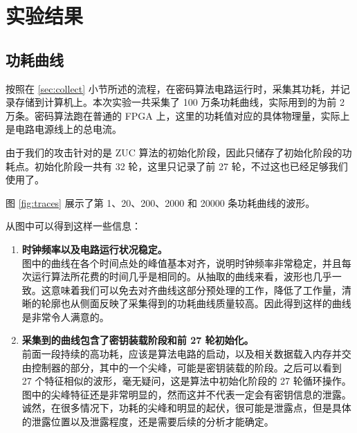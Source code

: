 

\chapter{实验结果}

\section{功耗曲线}

按照在 \ref{sec:collect} 小节所述的流程，在密码算法电路运行时，采集其功耗，并记录存储到计算机上。本次实验一共采集了 100 万条功耗曲线，实际用到的为前 2 万条。密码算法跑在普通的 FPGA 上，这里的功耗值对应的具体物理量，实际上是电路电源线上的总电流。 \cite{zuc_fpga} \cite{zuc_fpga_en}

由于我们的攻击针对的是 ZUC 算法的初始化阶段，因此只储存了初始化阶段的功耗点。初始化阶段一共有 32 轮，这里只记录了前 27 轮，不过这也已经足够我们使用了。

\vspace*{\baselineskip}

图 \ref{fig:traces} 展示了第 1、20、200、2000 和 20000 条功耗曲线的波形。

从图中可以得到这样一些信息：

\begin{enumerate}
    \item \textbf{时钟频率以及电路运行状况稳定。}\\
    图中的曲线在各个时间点处的峰值基本对齐，说明时钟频率非常稳定，并且每次运行算法所花费的时间几乎是相同的。从抽取的曲线来看，波形也几乎一致。这意味着我们可以免去对齐曲线这部分预处理的工作，降低了工作量，清晰的轮廓也从侧面反映了采集得到的功耗曲线质量较高。因此得到这样的曲线是非常令人满意的。
    \item \textbf{采集到的曲线包含了密钥装载阶段和前 27 轮初始化。}\\
    前面一段持续的高功耗，应该是算法电路的启动，以及相关数据载入内存并交由控制器的部分，其中的一个尖峰，可能是密钥装载的阶段。之后可以看到 27 个特征相似的波形，毫无疑问，这是算法中初始化阶段的 27 轮循环操作。图中的尖峰特征还是非常明显的，然而这并不代表一定会有密钥信息的泄露。诚然，在很多情况下，功耗的尖峰和明显的起伏，很可能是泄露点，但是具体的泄露位置以及泄露程度，还是需要后续的分析才能确定。
\end{enumerate}

